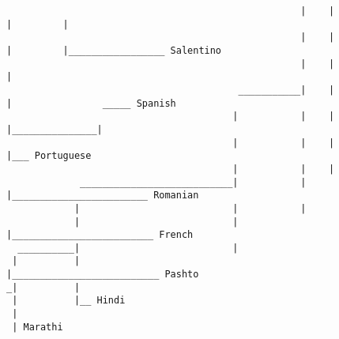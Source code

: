\begin{figure}[H]
\begin{center}
{\begin{verbatim}
                                                    |    |        |         |
                                                    |    |        |         |_________________ Salentino
                                                    |    |        |
                                         ___________|    |        |                _____ Spanish
                                        |           |    |        |_______________|
                                        |           |    |                        |___ Portuguese
                                        |           |    |
             ___________________________|           |    |________________________ Romanian
            |                           |           |
            |                           |           |_________________________ French
  __________|                           |
 |          |                           |__________________________ Pashto
_|          |
 |          |__ Hindi
 |
 | Marathi



\end{verbatim}
}
\label{...}
\end{center}
\end{figure}
